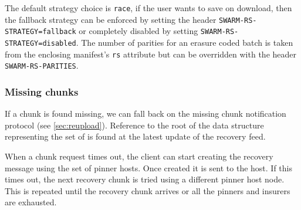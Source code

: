 The default strategy choice is \lstinline{race}, if the user wants to save on download, then the fallback strategy can be enforced by setting the header \lstinline{SWARM-RS-STRATEGY=fallback} or completely disabled by setting \lstinline{SWARM-RS-STRATEGY=disabled}. The number of parities for an erasure coded batch is taken from the enclosing manifest's \lstinline{rs} attribute but can be overridden with the header \lstinline{SWARM-RS-PARITIES}.

\subsubsection{Missing chunks}

If a chunk is found missing, we can fall back on the missing chunk notification protocol (see \ref{sec:reupload}). Reference to the root of the data structure representing the set of  is found at the latest update of the recovery feed. 

When a chunk request times out, the client can start creating the recovery message using the set of pinner hosts. Once created it is sent to the host. If this times out, the next recovery chunk is tried using a different pinner host node. This is repeated until the recovery chunk arrives or all the pinners and insurers are exhausted.




